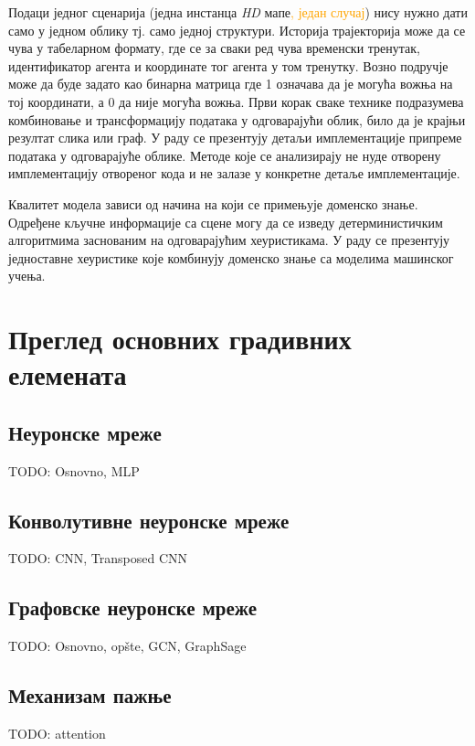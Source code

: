 \documentclass[11pt,oneside]{memoir}
\begin{document}
Подаци једног сценарија (једна инстанца \textit{HD} мапе\textcolor{orange}{, један случај}) нису нужно дати само у једном облику 
тј. само једној структури. Историја
трајекторија може да се чува у табеларном формату, где се за сваки ред чува временски тренутак, идентификатор агента и координате
тог агента у том тренутку. Возно подручје може да буде задато као бинарна матрица где 1 означава да је могућа вожња на тој координати, 
а 0 да није могућа вожња. Први корак
сваке технике подразумева комбиновање и трансформацију података у одговарајући облик, било да је крајњи резултат слика или граф. У раду
се презентују детаљи имплементације припреме података у одговарајуће облике. 
Методе које се анализирају не нуде отворену имплементацију отвореног кода и не залазе у конкретне детаље имплементације. 

Квалитет модела зависи од начина на који се примењује доменско знање. Одређене кључне информације
са сцене могу да се изведу детерминистичким алгоритмима заснованим на одговарајућим хеуристикама. У раду се презентују
једноставне хеуристике које комбинују доменско знање са моделима машинског учења.


\chapter{Преглед основних градивних елемената}
\label{chp:razrada}

\section{Неуронске мреже}

TODO: Osnovno, MLP

\section{Конволутивне неуронске мреже}

TODO: CNN, Transposed CNN

\section{Графовске неуронске мреже}

TODO: Osnovno, opšte, GCN, GraphSage

\section{Механизам пажње}

TODO: attention
\end{document}
